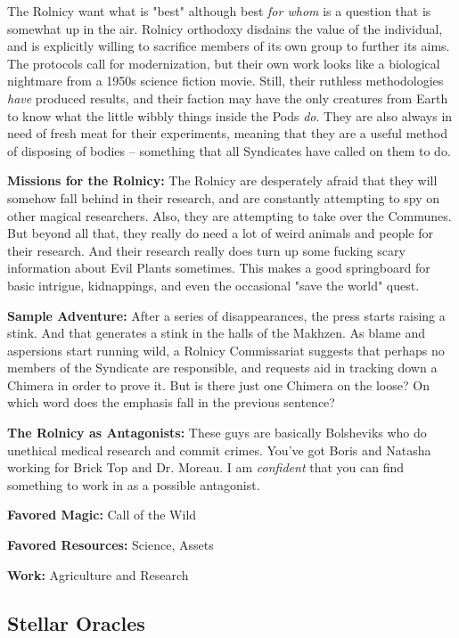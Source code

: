The Rolnicy want what is "best" although best \textit{for whom} is a question that is somewhat up in the air. Rolnicy orthodoxy disdains the value of the individual, and is explicitly willing to sacrifice members of its own group to further its aims. The protocols call for modernization, but their own work looks like a biological nightmare from a 1950s science fiction movie. Still, their ruthless methodologies \textit{have} produced results, and their faction may have the only creatures from Earth to know what the little wibbly things inside the Pods \textit{do}. They are also always in need of fresh meat for their experiments, meaning that they are a useful method of disposing of bodies -- something that all Syndicates have called on them to do.

\textbf{Missions for the Rolnicy:} The Rolnicy are desperately afraid that they will somehow fall behind in their research, and are constantly attempting to spy on other magical researchers. Also, they are attempting to take over the Communes. But beyond all that, they really do need a lot of weird animals and people for their research. And their research really does turn up some fucking scary information about Evil Plants sometimes. This makes a good springboard for basic intrigue, kidnappings, and even the occasional "save the world" quest.

\textbf{Sample Adventure:} After a series of disappearances, the press starts raising a stink. And that generates a stink in the halls of the Makhzen. As blame and aspersions start running wild, a Rolnicy Commissariat suggests that perhaps no members of the Syndicate are responsible, and requests aid in tracking down a Chimera in order to prove it. But is there just one Chimera on the loose? On which word does the emphasis fall in the previous sentence?

\textbf{The Rolnicy as Antagonists:} These guys are basically Bolsheviks who do unethical medical research and commit crimes. You've got Boris and Natasha working for Brick Top and Dr. Moreau. I am \textit{confident} that you can find something to work in as a possible antagonist.

\textbf{Favored Magic:} Call of the Wild

\textbf{Favored Resources:} Science, Assets

\textbf{Work:} Agriculture and Research

\subsection{Stellar Oracles} 

